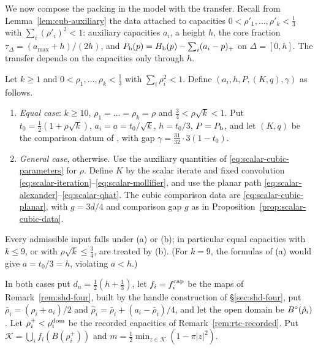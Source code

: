 We now compose the packing in the model with the transfer. Recall from Lemma~\ref{lem:cub-auxiliary} the data attached to
capacities $0<\rho'_1,\dots,\rho'_k<\frac13$ with $\sum_i(\rho'_i)^2<1$: auxiliary capacities $a_i$, a height $h$, the core fraction
$\tau_\Delta=(a_{\max}+h)/(2h)$, and $P_{\mathrm b}(p)=H_{\mathrm b}(p)-\sum_i(a_i-p)_+$ on $\Delta=[0,h]$. The transfer depends on the capacities only
through $h$.

\begin{construction}\label{cons:rtc-data}
Let $k\ge1$ and $0<\rho_1,\dots,\rho_k<\frac13$ with $\sum_i\rho_i^2<1$. Define $(a_i,h,P,(K,q),\gamma)$ as follows.
\begin{enumerate}[label=(\alph*)]
\item\emph{Equal case}: $k\ge10$, $\rho_1=\dots=\rho_k=\rho$ and $\frac34<\rho\sqrt k<1$. Put $t_0=\frac12(1+\rho\sqrt k)$, $a_i=a=t_0/\sqrt k$, $h=t_0/3$,
$P=P_{\mathrm b}$, and let $(K,q)$ be the comparison datum of , with gap
$\gamma=\frac{31}{32}\cdot3(1-t_0)$.
\item\emph{General case}, otherwise. Use the auxiliary quantities of
\eqref{eq:scalar-cubic-parameters} for $\rho$. Define $K$ by the scalar iterate and fixed convolution
\eqref{eq:scalar-iteration}--\eqref{eq:scalar-mollifier}, and use the planar path
\eqref{eq:scalar-alexander}--\eqref{eq:scalar-qhat}. The cubic comparison data are
\eqref{eq:scalar-cubic-planar}, with $g=3d/4$ and comparison gap $g$ as in
Proposition~\ref{prop:scalar-cubic-data}.
\end{enumerate}
Every admissible input falls under (a) or (b); in particular equal capacities with $k\le9$, or with $\rho\sqrt k\le\frac34$, are
treated by (b). (For $k=9$, the formulas of (a) would give $a=t_0/3=h$, violating $a<h$.)

In both cases put $d_n=\frac12(h+\frac13)$, let $f_i=f_i^{\rm cap}$ be the maps of Remark~\ref{rem:shd-four}, built by the handle construction of
\S\ref{sec:shd-four}, put $\bar\rho_i=(\rho_i+a_i)/2$ and $\hat\rho_i=\bar\rho_i+(a_i-\bar\rho_i)/4$, and let the open domain be
$B^{\circ}(\hat\rho_i)$. Let $\rho_i^+<\rho_i^{\rm dom}$ be the recorded capacities of Remark~\ref{rem:rtc-recorded}. Put
$\mathcal K=\bigcup_i f_i(B(\rho_i^+))$ and $m=\frac12\min_{z\in\mathcal K}(1-\pi|z|^2)$.
\end{construction}

